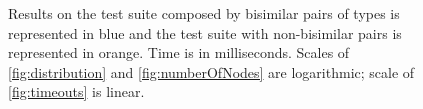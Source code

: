 \begin{figure}[t]
\centering
  
  \caption{Results on the test suite composed by bisimilar pairs of
    types is represented in blue and the test suite with
    non-bisimilar pairs is represented in orange. Time is in
    milliseconds.  Scales of \ref{fig:distribution} and
    \ref{fig:numberOfNodes} are logarithmic; scale of
    \ref{fig:timeouts} is linear.}
\label{fig:results}
\end{figure}
  
